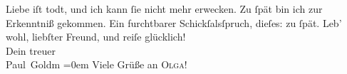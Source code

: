 \begin{ledgroupsized}[t]{13cm}
               Liebe iſt todt, und ich kann ſie nicht mehr erwecken. Zu ſpät bin ich zur Erkenntniß
               gekommen. Ein furchtbarer Schickſalsſpruch, dieſes: zu ſpät.\pend
           \pstart
           Leb’ wohl, liebſter Freund, und reiſe glücklich! {\\[\baselineskip]}Dein treuer {\\[\baselineskip]}\spacefill\mbox{Paul Goldm}\pend
           \leftskip=0em{}\pstart
           \noindent{}Viele Grüße an \textsc{Olga}!\pend
           
         
         \endnumbering{}\end{ledgroupsized}  \newcommand{\dateiname}{L03380}\newcommand{\titel}{Paul Goldmann an Arthur Schnitzler, 4. 8. [1903]}\newcommand{\editorInnen}{Martin Anton Müller und Laura Untner}
      